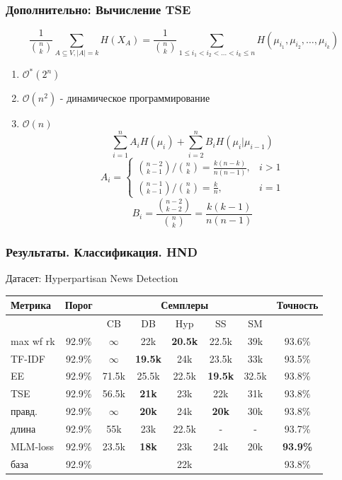 \documentclass{beamer}
\begin{document}
\begin{frame}[label=supplemental,noframenumbering]
	\frametitle{Дополнительно: Вычисление TSE}
	\[
	\frac{1}{\binom{n}{k}}\sum\limits_{A\subseteq V,|A|=k}H(X_A) =
	\frac{1}{\binom{n}{k}}\sum\limits_{1 \le i_1 < i_2 < \ldots < i_k \le n}H(\mu_{i_1}, \mu_{i_2}, \ldots, \mu_{i_k})
	\]
	\begin{enumerate}
		\item $\mathcal{O^*}(2^n)$
		\item $\mathcal{O}(n^2)$ - динамическое программирование
		\item $\mathcal{O}(n)$
		\[
		\sum\limits_{i=1}^{n}A_iH(\mu_i) + \sum\limits_{i=2}^{n}B_iH(\mu_i|\mu_{i-1})
		\]
		\[
		A_i = 
		\begin{cases}
		\binom{n-2}{k-1}/\binom{n}{k}=\frac{k(n-k)}{n(n-1)},& i > 1 \\
		\binom{n-1}{k-1}/\binom{n}{k}=\frac k n,& i = 1
		\end{cases}
		\]
		\[
		B_i = \frac{\binom{n-2}{k-2}}{\binom{n}{k}} = \frac{k(k-1)}{n(n-1)}
		\]
	\end{enumerate}
\end{frame}

\begin{frame}[label=supplemental,noframenumbering]
	\frametitle{Результаты. Классификация. HND}
	\let\thefootnote\relax{}
	
	Датасет: Hyperpartisan News Detection
	
	\begin{table}
		\begin{tabular}{|l|c|ccccc|c|}
			\hline
			Метрика & Порог & & \multicolumn{3}{c}{Семплеры} & & Точность \\
			\hline
			 & & CB & DB & Hyp & SS & SM &\\
			\hline
			max wf rk & 92.9\%  & $\infty$ & 22k & {\bf 20.5k} & 22.5k & 39k & 93.6\% \\
			TF-IDF & 92.9\%  & $\infty$ & {\bf 19.5k} & 24k & 23.5k & 33k & 93.5\% \\
			EE & 92.9\%  & 71.5k & 25.5k & 22.5k & {\bf 19.5k} & 32.5k & 93.8\% \\
			TSE & 92.9\% & 56.5k & {\bf 21k} & 23k & 22k & 31k & 93.8\% \\
			правд. & 92.9\%  & $\infty$ & {\bf 20k} & 24k & {\bf 20k} & 30k & 93.8\% \\
			длина & 92.9\% & 55k & 23k & 22.5k & - & - & 93.7\% \\
			MLM-loss & 92.9\% & 23.5k & {\bf 18k} & 23k & 24k & 20k & {\bf 93.9\%} \\
			\hline
			база & 92.9\%  & & \multicolumn{3}{c}{22k} & & 93.8\% \\
			\hline
		\end{tabular}
	\end{table}
\end{frame}
\end{document}
